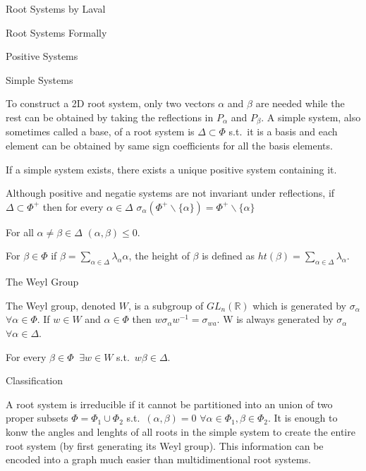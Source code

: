 \documentclass[12pt, letterpaper]{article}
\newcommand{\R}{\mathbb{R}}
\begin{document}
\begin{section}{Root Systems by Laval}
\begin{subsection}{Root Systems Formally}
\begin{subsubsection}{Positive Systems}
    \end{subsubsection}

    \begin{subsubsection}{Simple Systems}

      To construct a 2D root system, only two vectors \(\alpha\) and \(\beta\)
      are needed while the rest can be obtained by taking the reflections in
      \(P_{\alpha}\) and \(P_{\beta}\). A simple system, also sometimes called a
      base, of a root system is \(\Delta \subset \Phi\) s.t.\ it is a basis and
      each element can be obtained by same sign coefficients for all the basis
      elements.

      If a simple system exists, there exists a unique positive system
      containing it.

      Although positive and negatie systems are not invariant under reflections,
      if \(\Delta \subset \Phi^{+}\) then for every \(\alpha \in \Delta\)
      \(\sigma_{\alpha}(\Phi^{+} \backslash \{\alpha\}) =
      \Phi^{+} \backslash \{\alpha\}\)

      For all \(\alpha \neq \beta \in \Delta\) \((\alpha, \beta) \leq 0\).

      For \(\beta \in \Phi\) if \(\beta = \sum_{\alpha \in \Delta}
      \lambda_{\alpha} \alpha\), the height of \(\beta\) is defined as
      \(ht(\beta) = \sum_{\alpha \in \Delta} \lambda_{\alpha}\).

    \end{subsubsection}

  \end{subsection}

  \begin{subsection}{The Weyl Group}

    The Weyl group, denoted \(W\), is a subgroup of \(GL_{n}(\R)\) which is
    generated by \(\sigma_{\alpha}\) \(\forall \alpha \in \Phi\). If
    \(w \in W\) and \(\alpha \in \Phi\) then
    \(w \sigma_{\alpha} w^{-1} = \sigma_{wa}\). W is always generated by
    \(\sigma_{\alpha}\) \(\forall \alpha \in \Delta\).

    For every \(\beta \in \Phi \;\; \exists w \in W\) s.t.\
    \(w \beta \in \Delta\).

  \end{subsection}

  \begin{subsection}{Classification}

    A root system is irreducible if it cannot be partitioned into an union of
    two proper subsets \(\Phi = \Phi_{1} \cup \Phi_{2}\) s.t.\
    \((\alpha, \beta) = 0\) \(\forall \alpha \in \Phi_{1},
    \beta \in \Phi_{2}\). It is enough to konw the angles and lenghts of all
    roots in the simple system to create the entire root system (by first
    generating its Weyl group). This information can be encoded into a graph
    much easier than multidimentional root systems.


\end{subsection}
\end{section}
\end{document}
